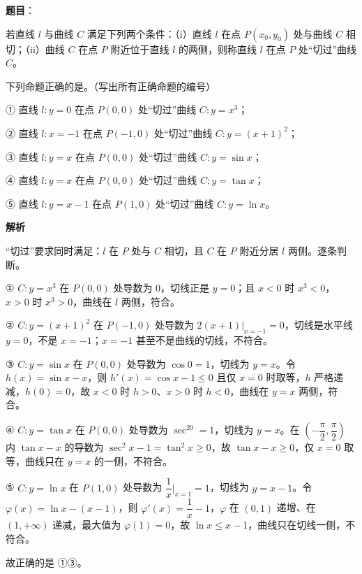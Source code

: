 \begin{answer}

\textbf{题目}：

若直线 $l$ 与曲线 $C$ 满足下列两个条件：（i）直线 $l$ 在点 $P(x_0,y_0)$ 处与曲线 $C$ 相切；（ii）曲线 $C$ 在点 $P$ 附近位于直线 $l$ 的两侧，则称直线 $l$ 在点 $P$ 处“切过”曲线 $C$。

下列命题正确的是\gkblank{}。（写出所有正确命题的编号）

① 直线 $l:y=0$ 在点 $P(0,0)$ 处“切过”曲线 $C:y=x^3$；

② 直线 $l:x=-1$ 在点 $P(-1,0)$ 处“切过”曲线 $C:y=(x+1)^2$；

③ 直线 $l:y=x$ 在点 $P(0,0)$ 处“切过”曲线 $C:y=\sin x$；

④ 直线 $l:y=x$ 在点 $P(0,0)$ 处“切过”曲线 $C:y=\tan x$；

⑤ 直线 $l:y=x-1$ 在点 $P(1,0)$ 处“切过”曲线 $C:y=\ln x$。

\textbf{解析}

“切过”要求同时满足：$l$ 在 $P$ 处与 $C$ 相切，且 $C$ 在 $P$ 附近分居 $l$ 两侧。逐条判断。

① $C:y=x^3$ 在 $P(0,0)$ 处导数为 $0$，切线正是 $y=0$；且 $x<0$ 时 $x^3<0$，$x>0$ 时 $x^3>0$，曲线在 $l$ 两侧，符合。

② $C:y=(x+1)^2$ 在 $P(-1,0)$ 处导数为 $2(x+1)\big|_{x=-1}=0$，切线是水平线 $y=0$，不是 $x=-1$；$x=-1$ 甚至不是曲线的切线，不符合。

③ $C:y=\sin x$ 在 $P(0,0)$ 处导数为 $\cos0=1$，切线为 $y=x$。令 $h(x)=\sin x-x$，则 $h'(x)=\cos x-1\leqslant0$ 且仅 $x=0$ 时取等，$h$ 严格递减，$h(0)=0$，故 $x<0$ 时 $h>0$、$x>0$ 时 $h<0$，曲线在 $y=x$ 两侧，符合。

④ $C:y=\tan x$ 在 $P(0,0)$ 处导数为 $\sec^20=1$，切线为 $y=x$。在 $\left(-\dfrac\pi2,\dfrac\pi2\right)$ 内 $\tan x-x$ 的导数为 $\sec^2x-1=\tan^2x\geqslant0$，故 $\tan x-x\geqslant0$，仅 $x=0$ 取等，曲线只在 $y=x$ 的一侧，不符合。

⑤ $C:y=\ln x$ 在 $P(1,0)$ 处导数为 $\dfrac1x\bigg|_{x=1}=1$，切线为 $y=x-1$。令 $\varphi(x)=\ln x-(x-1)$，则 $\varphi'(x)=\dfrac1x-1$，$\varphi$ 在 $(0,1)$ 递增、在 $(1,+\infty)$ 递减，最大值为 $\varphi(1)=0$，故 $\ln x\leqslant x-1$，曲线只在切线一侧，不符合。

故正确的是 ①③。


\end{answer}
